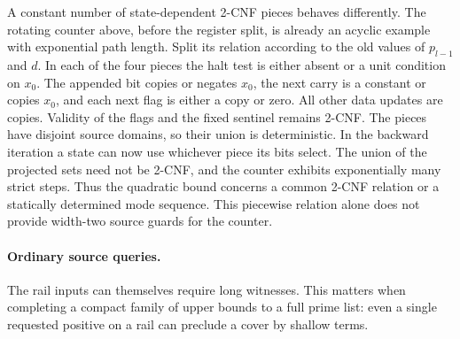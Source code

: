 A constant number of state-dependent 2-CNF pieces behaves
differently. The rotating counter above, before the register
split, is already an acyclic example with exponential path
length. Split its relation according to the old values of
$p_{l-1}$ and $d$. In each of the four pieces the halt test
is either absent or a unit condition on $x_0$. The appended
bit copies or negates $x_0$, the next carry is a constant or
copies $x_0$, and each next flag is either a copy or zero.
All other data updates are copies. Validity of the flags and
the fixed sentinel remains 2-CNF. The pieces have disjoint
source domains, so their union is deterministic. In the
backward iteration a state can now use whichever piece its
bits select. The union of the projected sets need not be
2-CNF, and the counter exhibits exponentially many strict
steps. Thus the quadratic bound concerns a common 2-CNF
relation or a statically determined mode sequence. This
piecewise relation alone does not provide width-two source
guards for the counter.

\paragraph{Ordinary source queries.}
The rail inputs can themselves require long witnesses. This matters
when completing a compact family of upper bounds to a full prime list:
even a single requested positive on a rail can preclude a cover by
shallow terms.

